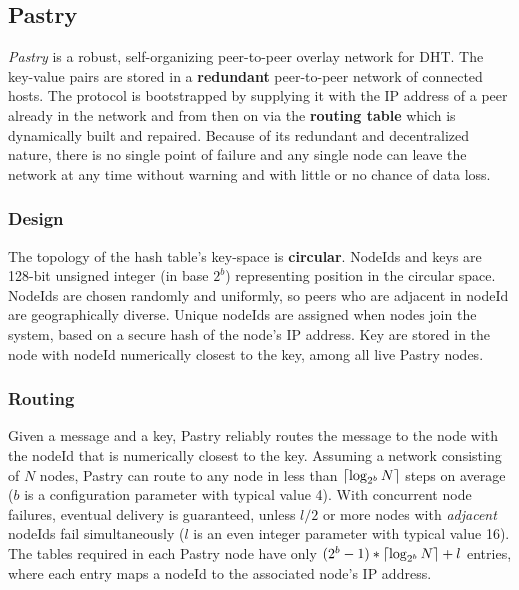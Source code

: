\documentclass[a4paper,12pt]{article}
\DeclarePairedDelimiter{\ceil}{\lceil}{\rceil}
\begin{document}
\subsection{Pastry}
\textit{Pastry} is a robust, self-organizing peer-to-peer overlay network for DHT. The key-value pairs are stored in a \textbf{redundant} peer-to-peer network of connected hosts. The protocol is bootstrapped by supplying it with the IP address of a peer already in the network and from then on via the \textbf{routing table} which is dynamically built and repaired. Because of its redundant and decentralized nature, there is no single point of failure and any single node can leave the network at any time without warning and with little or no chance of data loss.

\subsubsection{Design}
The topology of the hash table's key-space is \textbf{circular}. NodeIds and keys are 128-bit unsigned integer (in base $2^b$) representing position in the circular space. NodeIds are chosen randomly and uniformly, so peers who are adjacent in nodeId are geographically diverse. Unique nodeIds are assigned when nodes join the system, based on a secure hash of the node’s IP address. Key are stored in the node with nodeId numerically closest to the key, among all live Pastry nodes.

\subsubsection{Routing}
Given a message and a key, Pastry reliably routes the message to the node with the nodeId that is numerically closest to the key. Assuming a network consisting of $N$ nodes, Pastry can route to any node in less than $\ceil{\log_{2^b}N}$ steps on average ($b$ is a configuration parameter with typical value 4). With concurrent node failures, eventual delivery is guaranteed, unless $l/2$ or more nodes with \textit{adjacent} nodeIds fail simultaneously ($l$ is an even integer parameter with typical value 16). The tables required in each Pastry node have only $(2^b - 1) * \ceil{\log_{2^b}N} + l$ entries, where each entry maps a nodeId to the associated node’s IP address.
\end{document}
